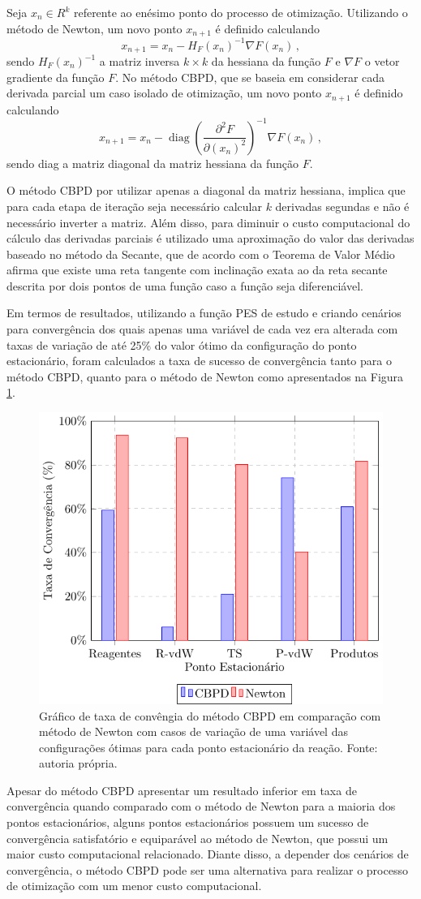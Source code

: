 \documentclass{pssbmac}
\DeclareMathOperator{\diag}{diag}
\begin{document}
Seja $x_n \in R^k$ referente ao enésimo ponto do processo de otimização. Utilizando o método de Newton, um novo ponto $x_{n+1}$ é definido calculando
%
\begin{equation}
  x_{n+1} = x_n - H_F(x_n)^{-1} \nabla F(x_n) \,,
\end{equation}
%
sendo $H_F(x_n)^{-1}$ a matriz inversa $k \times k$ da hessiana da função $F$ e $\nabla F$ o vetor gradiente da função $F$.
No método CBPD, que se baseia em considerar cada derivada parcial um caso isolado de otimização, um novo ponto $x_{n+1}$ é definido calculando
%
\begin{equation}
  x_{n+1} = x_n - \diag{\left(\frac{\partial^2 F}{\partial (x_{n})^2 }\right)}^{-1} \nabla F(x_n) \,,
\end{equation}
%
sendo diag a matriz diagonal da matriz hessiana da função $F$.

O método CBPD por utilizar apenas a diagonal da matriz hessiana, implica que para cada etapa de iteração seja necessário calcular $k$ derivadas segundas e não é necessário inverter a matriz. Além disso, para diminuir o custo computacional do cálculo das derivadas parciais é utilizado uma aproximação do valor das derivadas baseado no método da Secante, que de acordo com o Teorema de Valor Médio\cite{calculo_1} afirma que existe uma reta tangente com inclinação exata ao da reta secante descrita por dois pontos de uma função caso a função seja diferenciável.

Em termos de resultados, utilizando a função PES de estudo e criando cenários para convergência dos quais apenas uma variável de cada vez era alterada com taxas de variação de até 25\% do valor ótimo da configuração do ponto estacionário, foram calculados a taxa de sucesso de convergência tanto para o método CBPD, quanto para o método de Newton como apresentados na Figura \ref{figura01}.
%
\begin{figure}[H]
\centering
\includegraphics[width=.425\textwidth]{image}
\caption{ {\small Gráfico de taxa de convêngia do método CBPD em comparação com método de Newton com casos de variação de uma variável das configurações ótimas para cada ponto estacionário da reação. Fonte: autoria própria.}}
\label{figura01}
\end{figure}
%
Apesar do método CBPD apresentar um resultado inferior em taxa de convergência quando comparado com o método de Newton para a maioria dos pontos estacionários, alguns pontos estacionários possuem um sucesso de convergência satisfatório e equiparável ao método de Newton, que possui um maior custo computacional relacionado. Diante disso, a depender dos cenários de convergência, o método CBPD pode ser uma alternativa para realizar o processo de otimização com um menor custo computacional.

\printbibliography
\end{document}
